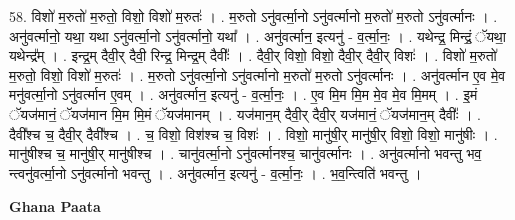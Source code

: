 \documentclass[17pt]{extarticle}
\begin{document}
58. विशो॑ म॒रुतो॑ म॒रुतो॒ विशो॒ विशो॑ म॒रुतः॑ । . म॒रुतो ऽनु॑वर्त्मा॒नो ऽनु॑वर्त्मानो म॒रुतो॑ म॒रुतो ऽनु॑वर्त्मानः । . अनु॑वर्त्मानो॒ यथा॒ यथा ऽनु॑वर्त्मा॒नो ऽनु॑वर्त्मानो॒ यथा᳚ । . अनु॑वर्त्मान॒ इत्यनु॑ - व॒र्त्मा॒नः॒ । . यथेन्द्र॒ मिन्द्रं॒ ॅयथा॒ यथेन्द्र᳚म् । . इन्द्र॒म् दैवी॒र् दैवी॒ रिन्द्र॒ मिन्द्र॒म् दैवीः᳚ । . दैवी॒र् विशो॒ विशो॒ दैवी॒र् दैवी॒र् विशः॑ । . विशो॑ म॒रुतो॑ म॒रुतो॒ विशो॒ विशो॑ म॒रुतः॑ । . म॒रुतो ऽनु॑वर्त्मा॒नो ऽनु॑वर्त्मानो म॒रुतो॑ म॒रुतो ऽनु॑वर्त्मानः । . अनु॑वर्त्मान ए॒व मे॒व मनु॑वर्त्मा॒नो ऽनु॑वर्त्मान ए॒वम् । . अनु॑वर्त्मान॒ इत्यनु॑ - व॒र्त्मा॒नः॒ । . ए॒व मि॒म मि॒म मे॒व मे॒व मि॒मम् । . इ॒मं ॅयज॑मानं॒ ॅयज॑मान मि॒म मि॒मं ॅयज॑मानम् । . यज॑मान॒म् दैवी॒र् दैवी॒र् यज॑मानं॒ ॅयज॑मान॒म् दैवीः᳚ । . दैवी᳚श्च च॒ दैवी॒र् दैवी᳚श्च । . च॒ विशो॒ विश॑श्च च॒ विशः॑ । . विशो॒ मानु॑षी॒र् मानु॑षी॒र् विशो॒ विशो॒ मानु॑षीः । . मानु॑षीश्च च॒ मानु॑षी॒र् मानु॑षीश्च । . चानु॑वर्त्मा॒नो ऽनु॑वर्त्मानश्च॒ चानु॑वर्त्मानः । . अनु॑वर्त्मानो भवन्तु भव॒ न्त्वनु॑वर्त्मा॒नो ऽनु॑वर्त्मानो भवन्तु । . अनु॑वर्त्मान॒ इत्यनु॑ - व॒र्त्मा॒नः॒ । . भ॒व॒न्त्विति॑ भवन्तु । \newline

\textbf{Ghana Paata } \newline
\end{document}
